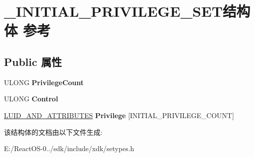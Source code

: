 \hypertarget{struct___i_n_i_t_i_a_l___p_r_i_v_i_l_e_g_e___s_e_t}{}\section{\+\_\+\+I\+N\+I\+T\+I\+A\+L\+\_\+\+P\+R\+I\+V\+I\+L\+E\+G\+E\+\_\+\+S\+E\+T结构体 参考}
\label{struct___i_n_i_t_i_a_l___p_r_i_v_i_l_e_g_e___s_e_t}
\subsection*{Public 属性}
\begin{DoxyCompactItemize}
\item 
\mbox{\label{struct___i_n_i_t_i_a_l___p_r_i_v_i_l_e_g_e___s_e_t_a3c552965faa10eef25950ca6bbd037be}} 
U\+L\+O\+NG {\bfseries Privilege\+Count}
\item 
\mbox{\label{struct___i_n_i_t_i_a_l___p_r_i_v_i_l_e_g_e___s_e_t_a12e4e2c9ccf287e600068a1546dfc5a7}} 
U\+L\+O\+NG {\bfseries Control}
\item 
\mbox{\label{struct___i_n_i_t_i_a_l___p_r_i_v_i_l_e_g_e___s_e_t_a705c4262403cac4221ec88ec8a6b23d6}} 
\hyperlink{struct___l_u_i_d___a_n_d___a_t_t_r_i_b_u_t_e_s}{L\+U\+I\+D\+\_\+\+A\+N\+D\+\_\+\+A\+T\+T\+R\+I\+B\+U\+T\+ES} {\bfseries Privilege} \mbox{[}I\+N\+I\+T\+I\+A\+L\+\_\+\+P\+R\+I\+V\+I\+L\+E\+G\+E\+\_\+\+C\+O\+U\+NT\mbox{]}
\end{DoxyCompactItemize}


该结构体的文档由以下文件生成\+:\begin{DoxyCompactItemize}
\item 
E\+:/\+React\+O\+S-\/0../sdk/include/xdk/setypes.\+h\end{DoxyCompactItemize}
